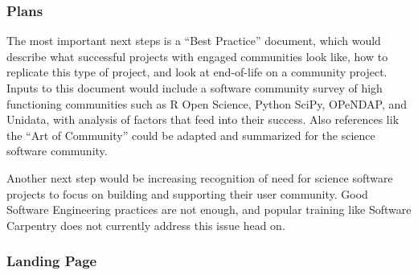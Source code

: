 \subsubsection{Plans}

The most important next steps is a ``Best Practice'' document, which would describe what successful projects with engaged
communities look like, how to replicate this type of project, and look at end-of-life on a community project. Inputs to this
document would include a software community survey of high functioning communities such as R Open Science, Python SciPy,
OPeNDAP, and Unidata, with analysis of factors that feed into their success. Also references lik the ``Art of Community'' could
be adapted and summarized for the science software community.

Another next step would be increasing recognition of need for science software projects to focus on building and supporting
their user community. Good Software Engineering practices are not enough, and popular training like Software Carpentry does
not currently address this issue head on.

\subsubsection{Landing Page}
